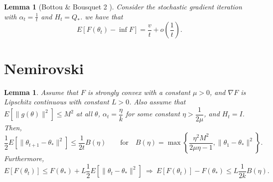 \documentclass[12pt]{article}
\newtheorem{lem}[theorem]{Lemma}
\begin{document}
	\begin{lem}[Bottou \& Bousquet 2 ]
		 Consider the stochastic gradient iteration with $\alpha_t = \frac{1}{t}$ and $H_t = Q_\ast$. we have that
	\[
	 E[F(\theta_t)-\inf F] = \frac{v}{t} + o(\frac{1}{t}).
	\]
	\end{lem}
	
	
	\section{Nemirovski}
	\begin{lem}
		Assume that $F$ is strongly convex with a constant $\mu>0$, and $\nabla F$ is Lipschitz continuous with constant $L>0$. Also assume that $E [\| g(\theta)\|^2  ] \leq M^2$ at all $\theta$, $\alpha_t = \dfrac{\eta}{k}$ for some constant $\eta > \dfrac{1}{2\mu}$, and $H_t = I$.
		Then,
		\[
		 \frac{1}{2}E[\|\theta_{t+1}-\theta_\ast\|^2] \leq \frac{1}{2t}B(\eta) \qquad\mbox{for} \quad B(\eta)=\max\left\lbrace\frac{\eta^2M^2}{2\mu\eta-1},\|\theta_1-\theta_\ast\|^2\right\rbrace.
		 \]
		 Furthermore, 	
		 \[
	 E[F(\theta_t)] \leq F(\theta_\ast) + L\frac{1}{2}E[\|\theta_t-\theta_\ast\|^2] \ \Rightarrow \ E[F(\theta_t)] - F(\theta_\ast) \leq L \frac{1}{2k}B(\eta).
	\]
		\end{lem}
\end{document}
